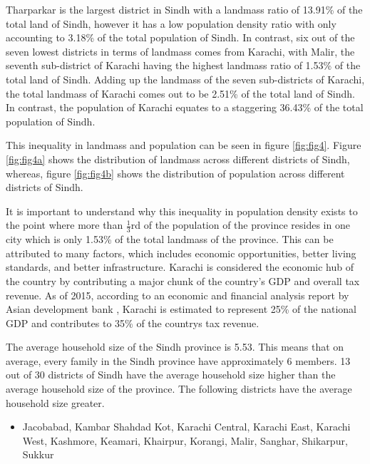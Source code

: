 \documentclass{article}
\begin{document}
\noindent Tharparkar is the largest district in Sindh with a landmass ratio of 13.91\% of the total land of Sindh, however it has a low population density ratio with only accounting to 3.18\% of the total population of Sindh. In contrast, six out of the seven lowest districts in terms of landmass comes from Karachi, with Malir, the seventh sub-district of Karachi having the highest landmass ratio of 1.53\% of the total land of Sindh. Adding up the landmass of the seven sub-districts of Karachi, the total landmass of Karachi comes out to be 2.51\% of the total land of Sindh. In contrast, the population of Karachi equates to a staggering 36.43\% of the total population of Sindh.

\vspace{0.5cm}

\noindent This inequality in landmass and population can be seen in figure \ref{fig:fig4}. Figure \ref{fig:fig4a} shows the distribution of landmass across different districts of Sindh, whereas, figure \ref{fig:fig4b} shows the distribution of population across different districts of Sindh.

\vspace{0.5cm}

\noindent It is important to understand why this inequality in population density exists to the point where more than $\frac{1}{3}$rd of the population of the province resides in one city which is only 1.53\% of the total landmass of the province. This can be attributed to many factors, which includes economic opportunities, better living standards, and better infrastructure. Karachi is considered the economic hub of the country by contributing a major chunk of the country's GDP and overall tax revenue. As of 2015, according to an economic and financial analysis report by Asian development bank \cite{bib3}, Karachi is estimated to represent 25\% of the national GDP and contributes to 35\% of the countrys tax revenue. 

\vspace{0.5cm}

\noindent The average household size of the Sindh province is 5.53. This means that on average, every family in the Sindh province have approximately 6 members. 13 out of 30 districts of Sindh have the average household size higher than the average household size of the province. The following districts have the average household size greater. 

\begin{itemize}
    \item Jacobabad, Kambar Shahdad Kot, Karachi Central, Karachi East, Karachi West, Kashmore, Keamari, Khairpur, Korangi, Malir, Sanghar, Shikarpur, Sukkur
\end{itemize}
\end{document}
